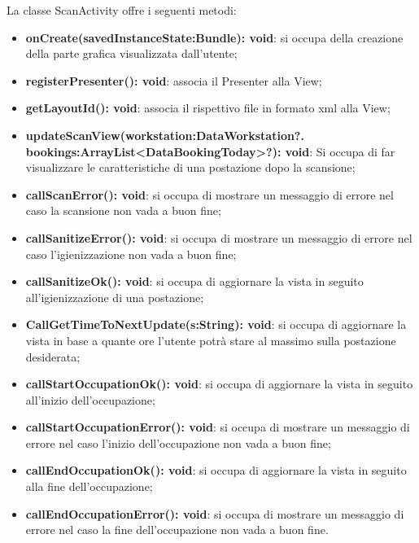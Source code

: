 La classe ScanActivity offre i seguenti metodi:
\begin{itemize}
	\item \textbf{onCreate(savedInstanceState:Bundle): void}: si occupa della creazione della parte grafica visualizzata dall'utente; 
	\item \textbf{registerPresenter(): void}: associa il Presenter alla View; 
	\item \textbf{getLayoutId(): void}: associa il rispettivo file in formato xml alla View;
	\item \textbf{updateScanView(workstation:DataWorkstation?. bookings:ArrayList<DataBookingToday>?): void}: Si occupa di far visualizzare le caratteristiche di una postazione dopo la scansione; 
	\item \textbf{callScanError(): void}: si occupa di mostrare un messaggio di errore nel caso la scansione non vada a buon fine;
	\item \textbf{callSanitizeError(): void}: si occupa di mostrare un messaggio di errore nel caso l'igienizzazione non vada a buon fine;
	\item \textbf{callSanitizeOk(): void}: si occupa di aggiornare la vista in seguito all'igienizzazione di una postazione;
	\item \textbf{CallGetTimeToNextUpdate(s:String): void}: si occupa di aggiornare la vista in base a quante ore l'utente potrà stare al massimo sulla postazione desiderata;
	\item \textbf{callStartOccupationOk(): void}: si occupa di aggiornare la vista in seguito all'inizio dell'occupazione;
	\item \textbf{callStartOccupationError(): void}: si occupa di mostrare un messaggio di errore nel caso l'inizio dell'occupazione non vada a buon fine;
	\item \textbf{callEndOccupationOk(): void}: si occupa di aggiornare la vista in seguito alla fine dell'occupazione;
	\item \textbf{callEndOccupationError(): void}: si occupa di mostrare un messaggio di errore nel caso la fine dell'occupazione non vada a buon fine.
\end{itemize}


